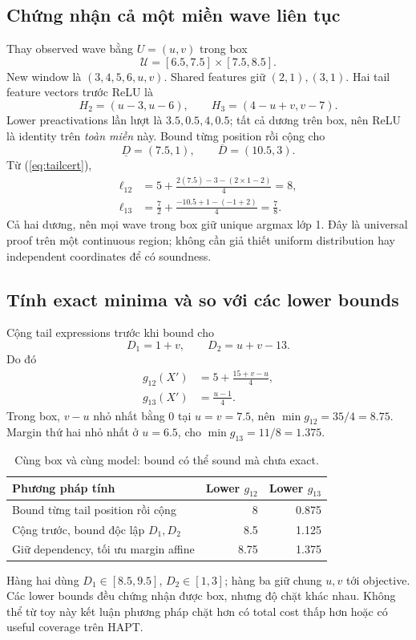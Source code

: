 \documentclass[11pt,a4paper]{article}
\newcommand{\Uset}{\mathcal U}
\theoremstyle{definition}
\begin{document}
\subsection{Chứng nhận cả một miền wave liên tục}
Thay observed wave bằng $U=(u,v)$ trong box
\begin{equation}
\Uset=[6.5,7.5]\times[7.5,8.5].
\end{equation}
New window là $(3,4,5,6,u,v)$. Shared features giữ $(2,1),(3,1)$.
Hai tail feature vectors trước ReLU là
\begin{equation}
H_2=(u-3,u-6),\qquad H_3=(4-u+v,v-7).
\end{equation}
Lower preactivations lần lượt là $3.5,0.5,4,0.5$; tất cả dương trên
box, nên ReLU là identity trên \emph{toàn miền} này. Bound từng position
rồi cộng cho
\begin{equation}
\underline D=(7.5,1),\qquad\overline D=(10.5,3).
\end{equation}
Từ (\ref{eq:tailcert}),
\begin{align}
\ell_{12}&=5+\frac{2(7.5)-3-(2\times1-2)}4=8,\\
\ell_{13}&=\frac72+\frac{-10.5+1-(-1+2)}4=\frac78.
\end{align}
Cả hai dương, nên mọi wave trong box giữ unique argmax lớp 1. Đây là
universal proof trên một continuous region; không cần giả thiết uniform
distribution hay independent coordinates để có soundness.

\subsection{Tính exact minima và so với các lower bounds}
Cộng tail expressions trước khi bound cho
\begin{equation}
D_1=1+v,\qquad D_2=u+v-13.
\end{equation}
Do đó
\begin{align}
g_{12}(X')&=5+\frac{15+v-u}{4},\\
g_{13}(X')&=\frac{u-1}{4}.
\end{align}
Trong box, $v-u$ nhỏ nhất bằng 0 tại $u=v=7.5$, nên
$\min g_{12}=35/4=8.75$. Margin thứ hai nhỏ nhất ở $u=6.5$, cho
$\min g_{13}=11/8=1.375$.

\begin{table}[!htbp]\centering\small
\caption{Cùng box và cùng model: bound có thể sound mà chưa exact.}
\begin{tabularx}{\linewidth}{@{}Yrr@{}}\toprule
Phương pháp tính & Lower $g_{12}$ & Lower $g_{13}$\\\midrule
Bound từng tail position rồi cộng &8&0.875\\
Cộng trước, bound độc lập $D_1,D_2$ &8.5&1.125\\
Giữ dependency, tối ưu margin affine &8.75&1.375\\\bottomrule
\end{tabularx}
\end{table}
Hàng hai dùng $D_1\in[8.5,9.5]$, $D_2\in[1,3]$; hàng ba giữ chung
$u,v$ tới objective. Các lower bounds đều chứng nhận được box, nhưng
độ chặt khác nhau. Không thể từ toy này kết luận phương pháp chặt hơn
có total cost thấp hơn hoặc có useful coverage trên HAPT.
\end{document}
